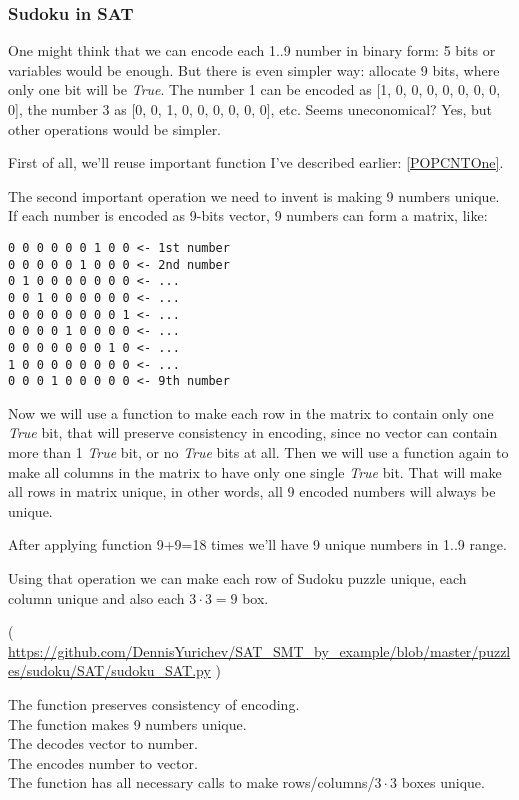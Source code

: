 \subsubsection{Sudoku in SAT}
\label{Sudoku_SAT}

One might think that we can encode each 1..9 number in binary form: 5 bits or variables would be enough.
But there is even simpler way: allocate 9 bits, where only one bit will be \textit{True}.
The number 1 can be encoded as [1, 0, 0, 0, 0, 0, 0, 0, 0], the number 3 as [0, 0, 1, 0, 0, 0, 0, 0, 0], etc.
Seems uneconomical? Yes, but other operations would be simpler.

First of all, we'll reuse important  function I've described earlier: \ref{POPCNTOne}.

The second important operation we need to invent is making 9 numbers unique.
If each number is encoded as 9-bits vector, 9 numbers can form a matrix, like:

\begin{lstlisting}
0 0 0 0 0 0 1 0 0 <- 1st number
0 0 0 0 0 1 0 0 0 <- 2nd number
0 1 0 0 0 0 0 0 0 <- ...
0 0 1 0 0 0 0 0 0 <- ...
0 0 0 0 0 0 0 0 1 <- ...
0 0 0 0 1 0 0 0 0 <- ...
0 0 0 0 0 0 0 1 0 <- ...
1 0 0 0 0 0 0 0 0 <- ...
0 0 0 1 0 0 0 0 0 <- 9th number
\end{lstlisting}

Now we will use a  function to make each row in the matrix to contain only one \textit{True} bit, that will
preserve consistency in encoding, since no vector can contain more than 1 \textit{True} bit, or no \textit{True} bits at all.
Then we will use a  function again to make all columns in the matrix to have only one single \textit{True} bit.
That will make all rows in matrix unique, in other words, all 9 encoded numbers will always be unique.

After applying  function 9+9=18 times we'll have 9 unique numbers in 1..9 range.

Using that operation we can make each row of Sudoku puzzle unique, each column unique and also each $3 \cdot 3=9$ box.


( \url{https://github.com/DennisYurichev/SAT_SMT_by_example/blob/master/puzzles/sudoku/SAT/sudoku_SAT.py} )

The  function preserves consistency of encoding.\\
The  function makes 9 numbers unique.\\
The  decodes vector to number.\\
The  encodes number to vector.\\
The  function has all necessary calls to make rows/columns/$3\cdot 3$ boxes unique.

